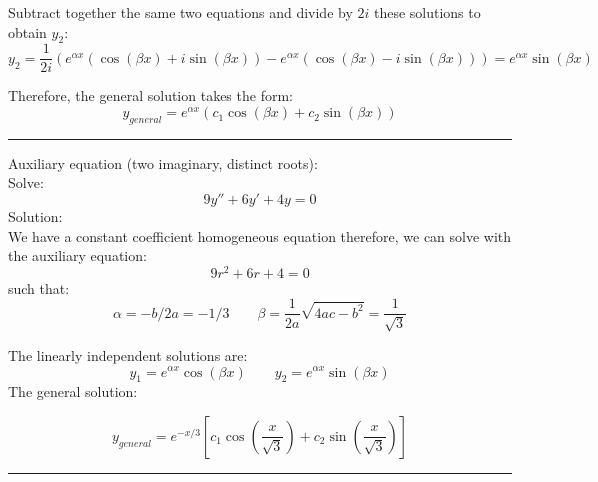 Subtract together the same two equations and divide by $2i$ these solutions to obtain $y_2$:
\begin{equation*}
y_2=\frac{1}{2i}(e^{\alpha x}\left(\cos(\beta x)+i\sin(\beta x)\right)-e^{\alpha x}\left(\cos(\beta x)-i\sin(\beta x)\right))=e^{\alpha x}\sin(\beta x)
\end{equation*}

Therefore, the general solution takes the form:
\begin{equation}
\boxed{y_{general}=e^{\alpha x}\left(c_1\cos(\beta x)+c_2\sin(\beta x)\right)}
\end{equation}






\begin{center}
\noindent\rule{4cm}{0.4pt}
\end{center}


\begin{exmp}{Auxiliary equation (two imaginary, distinct roots):}\\
Solve:
\begin{equation*}
9y''+6y'+4y=0
\end{equation*}
Solution: \\
We have a constant coefficient homogeneous equation therefore, we can solve with the auxiliary equation:
\begin{equation*}
9r^2+6r+4=0
\end{equation*}
such that:
\begin{equation*}
\alpha = -b/2a=-1/3 \qquad \beta=\frac{1}{2a}\sqrt{4ac-b^2}=\frac{1}{\sqrt{3}}
\end{equation*}

The linearly independent solutions are:
\begin{equation*}
y_1=e^{\alpha x}\cos(\beta x) \qquad y_2=e^{\alpha x}\sin(\beta x)
\end{equation*}
The general solution:

\begin{equation*}
y_{general}=e^{-x/3}\left[c_1 \cos(\frac{x}{\sqrt{3}})+c_2 \sin(\frac{x}{\sqrt{3}})\right]
\end{equation*}
\end{exmp}

\begin{center}
\noindent\rule{4cm}{0.4pt}
\end{center}

